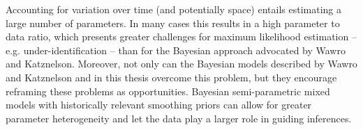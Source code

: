 Accounting for variation over time (and potentially space) entails estimating a large number of parameters. In many cases this results in a high parameter to data ratio, which presents greater challenges for maximum likelihood estimation -- e.g. under-identification -- than for the Bayesian approach advocated by Wawro and Katznelson. Moreover, not only can the Bayesian models described by Wawro and Katznelson and in this thesis overcome this problem, but they encourage reframing these problems as opportunities. Bayesian semi-parametric mixed models with historically relevant smoothing priors can allow for greater parameter heterogeneity and let the data play a larger role in guiding inferences. 

